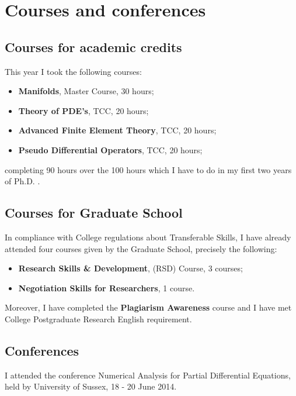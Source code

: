 \documentclass[a4paper,11pt, onecolumn]{article}
\newcommand{\gr}[1]{\textbf{#1}} %
\begin{document}
\newpage

\section{Courses and conferences}

\subsection{Courses for academic credits}

This year I took the following courses:
\begin{itemize}
\item \gr{Manifolds}, Master Course, 30 hours;
\item \gr{Theory of PDE's}, TCC, 20 hours;
\item \gr{Advanced Finite Element Theory}, TCC, 20 hours;
\item \gr{Pseudo Differential Operators}, TCC, 20 hours;
\end{itemize}
completing 90 hours over the 100 hours which I have to do in my first two years of Ph.D. .

\subsection{Courses for Graduate School}

In compliance with College regulations about Transferable Skills, I have already attended four courses given by the Graduate School, precisely the following:

\begin{itemize}
\item \gr{Research Skills \& Development}, (RSD) Course, 3 courses;
\item \gr{Negotiation Skills for Researchers}, 1 course.
\end{itemize}
 
\noindent Moreover, I have completed the \gr{Plagiarism Awareness} course and I have met College Postgraduate Research English requirement.

\subsection{Conferences}

I attended the conference Numerical Analysis for Partial Differential Equations, held by University of Sussex, 18 - 20 June 2014.

\newpage

\end{document}
